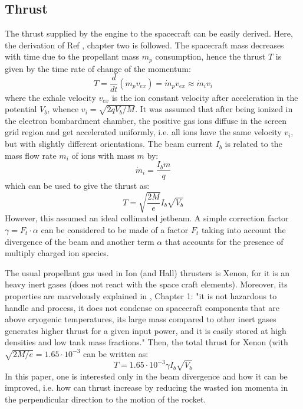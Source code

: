 \documentclass[twocolumn,12pt]{article}
\numberwithin{equation}{section} %
\numberwithin{equation}{section}
\begin{document}
\subsection{Thrust}
The thrust  supplied by the engine to the spacecraft can be easily derived. Here, the derivation of Ref \cite{fundamentalsofelectricpropulsion}, chapter two is followed. The spacecraft mass decreases with time due to the propellant mass $m_p$ consumption, hence the thrust $T$ is given by the time rate of change of the momentum:
\begin{equation}
T = \dfrac{d}{dt}(m_p v_{ex}) = \dot{m}_p v_{ex} \approx \dot{m}_i v_i
\end{equation}
where the exhale velocity $v_{ex}$ is the ion constant velocity after acceleration in the potential $V_b$, whence $v_i = \sqrt{2 q V_b/M}$. It was assumed that after being ionized in the electron bombardment chamber, the positive gas ions diffuse in the screen grid region and get accelerated uniformly, i.e. all ions have the same velocity $v_i$, but with slightly different orientations. The beam current $I_b$ is related to the mass flow rate $m_i$ of ions with mass $m$ by:
\begin{equation}
    \dot{m}_i = \dfrac{I_b m}{q}
\end{equation}
which can be used to give the thrust as:
\begin{equation}
    T = \sqrt{\dfrac{2M}{e}} I_b \sqrt{V_b} 
\end{equation}
However, this assumed an ideal collimated jetbeam. A simple correction factor $\gamma = F_t \cdot \alpha$ can be considered to be made of a factor $F_t$ taking into account the divergence of the beam and another term $\alpha$ that accounts for the presence of multiply charged ion species.

The usual propellant gas used in Ion (and Hall) thrusters is Xenon, for it is an heavy inert gases (does not react with the space craft elements). Moreover, its properties are marvelously explained in \cite{fundamentalsofelectricpropulsion}, Chapter 1: "it is not hazardous to handle and process, it does not condense on spacecraft components that are above cryogenic temperatures, its large mass compared to other inert gases generates higher thrust for a given input power, and it is easily stored at high densities and low tank mass fractions." Then, the total thrust for Xenon (with $\sqrt{2M/e} = 1.65 \cdot 10^{-3}$ can be written as:
\begin{equation}
    T = 1.65 \cdot 10^{-3} \gamma I_b \sqrt{V_b}
\end{equation}
In this paper, one is interested only in the beam divergence and how it can be improved, i.e. how can thrust increase by reducing the wasted ion momenta in the perpendicular direction to the motion of the rocket.
\end{document}

